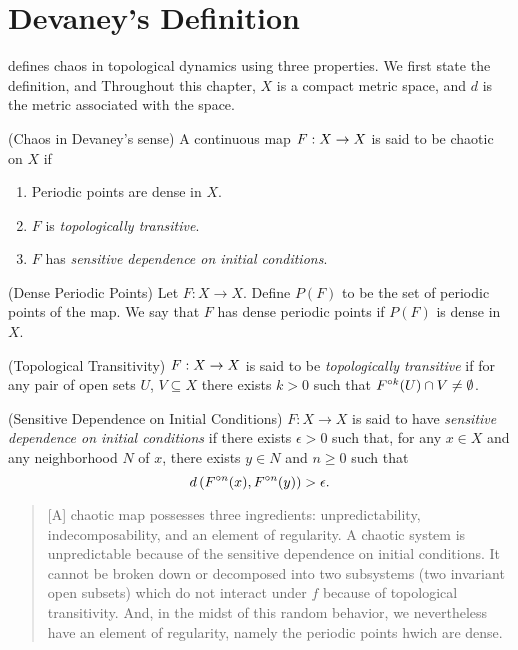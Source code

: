 \documentclass[12pt,draft,twoside]{book}
\begin{document}
\chapter{Devaney's Definition}
\label{chap:devaney}
\citet{devaney} defines chaos in topological dynamics using three properties.
We first state the definition, and 
Throughout this chapter, $X$ is a compact metric space, and $d$ is the metric associated with the space.
\begin{definition}
  (Chaos in Devaney's sense) 
  A continuous map $F: X\rightarrow X$ is said to be chaotic on $X$ if
  \begin{enumerate}
    \item Periodic points are dense in $X$.
    \item $F$ is \textit{topologically transitive}.
    \item $F$ has \textit{sensitive dependence on initial conditions}.
  \end{enumerate}
\end{definition}
%
\begin{definition}
  (Dense Periodic Points) 
  Let $F: X \to X$.
  Define $P(F)$ to be the set of periodic points of the map.
  We say that $F$ has dense periodic points if $P(F)$ is dense in $X$.
\end{definition}
%
\begin{definition}
  (Topological Transitivity) 
  $F: X \rightarrow X$ is said to be \textit{topologically transitive} if for any pair of open sets $U$, $V \subseteq X$ there exists $k > 0$ such that $F^{\circ k}(U) \cap V \neq \emptyset$.
  \label{defn:transitivity}
\end{definition}
%
\begin{definition}
  (Sensitive Dependence on Initial Conditions) 
  $F: X \rightarrow X$ is said to have \textit{sensitive dependence on initial conditions} if there exists $\epsilon > 0$ such that, for any $x \in X$ and any neighborhood $N$ of $x$, there exists $y\in N$ and $n\geq 0$ such that 
  \begin{equation*}
    d\left( F^{\circ n}(x), F^{\circ n}(y) \right) > \epsilon.
  \end{equation*}
  \label{defn:sdic}
\end{definition}
%
\citet[p.50]{devaney}
\begin{quotation}
  [A] chaotic map possesses three ingredients:
  unpredictability, indecomposability, and an element of regularity.
  A chaotic system is unpredictable because of the sensitive dependence on initial conditions.
  It cannot be broken down or decomposed into two subsystems (two invariant open subsets) which do not interact under $f$ because of topological transitivity.
  And, in the midst of this random behavior, we nevertheless have an element of regularity, namely the periodic points hwich are dense.
\end{quotation}
\end{document}
